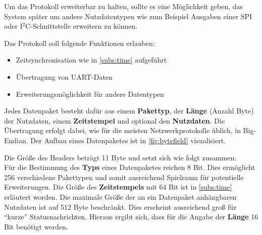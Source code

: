 Um das Protokoll erweiterbar zu halten, sollte es eine Möglichkeit geben, das
System später um andere Nutzdatentypen wie zum Beispiel Ausgaben einer SPI oder
I$^2$C-Schnittstelle erweitern zu können.

\begin{minipage}[c]{\textwidth}
Das Protokoll soll folgende Funktionen erlauben:
\begin{itemize}
  \item Zeitsynchronisation wie in \autoref{subs:time} aufgeführt
  \item Übertragung von UART-Daten
  \item Erweiterungsmöglichkeit für andere Datentypen
\end{itemize}
\end{minipage}

Jedes Datenpaket besteht dafür aus einem \textbf{Pakettyp}, der \textbf{Länge}
(Anzahl Byte) der Nutzdaten, einem \textbf{Zeitstempel} und optional den
\textbf{Nutzdaten}. Die Übertragung erfolgt dabei, wie für die meisten
Netzwerkprotokolle üblich, in Big-Endian. Der Aufbau eines Datenpaketes ist in
\autoref{fig:bytefield} visualisiert.

Die Größe des Headers beträgt 11 Byte und setzt sich wie folgt zusammen:\\
Für die Bestimmung des \textbf{Typs} eines Datenpaketes reichen 8 Bit. Dies
ermöglicht 256 verschiedene Pakettypen und somit ausreichend Spielraum für
potentielle Erweiterungen. Die Größe des \textbf{Zeitstempels} mit 64 Bit ist in
\autoref{subs:time} erläutert worden. Die maximale Größe der an ein
Datenpaket anhängbaren Nutzdaten ist auf 512 Byte beschränkt. Dies erscheint
ausreichend groß für "`kurze"' Statusnachrichten. Hieraus ergibt sich, dass für
die Angabe der \textbf{Länge} 16 Bit benötigt werden.


